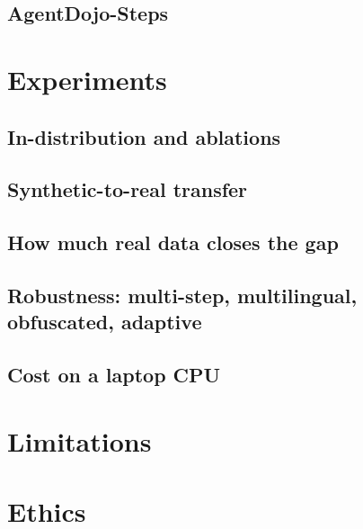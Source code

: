 \documentclass[11pt]{article}
\begin{document}
\subsection{AgentDojo-Steps}

\section{Experiments}
\subsection{In-distribution and ablations}

\subsection{Synthetic-to-real transfer}
\subsection{How much real data closes the gap}
\subsection{Robustness: multi-step, multilingual, obfuscated, adaptive}
\subsection{Cost on a laptop CPU}

\section{Limitations}
\section{Ethics}



\end{document}
